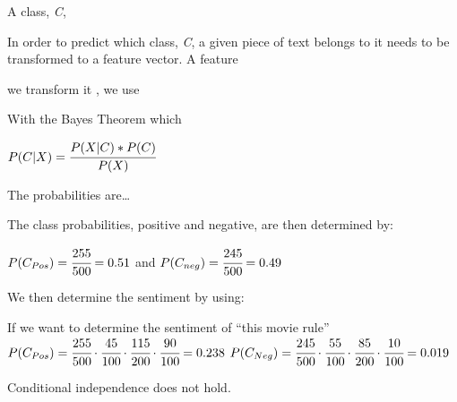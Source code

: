 


A class, \textit{C}, 



In order to predict which class, \textit{C}, a given piece of text belongs to it
needs to be transformed to a feature vector. A feature 

 we transform it , we use

With the
Bayes Theorem which

$P(C|X) = \cfrac{P(X|C)*P(C)}{P(X)}$

\citep[p.229]{MIBook}
\citep[Ch.2.1]{Bayes}
The probabilities are\ldots

The class probabilities, positive and negative, are then determined by:
\begin{center}
$P(C_{Pos}) = \cfrac{255}{500} = 0.51 $ and $P(C_{neg}) = \cfrac{245}{500} =
0.49 $
\end{center}

We then determine the sentiment by using:



If we want to determine the sentiment of ``this movie rule''  
$ P(C_{Pos}) = \cfrac{255}{500} \cdot \cfrac{45}{100} \cdot \cfrac{115}{200}
\cdot \cfrac{90}{100} = 0.238$
$ P(C_{Neg}) = \cfrac{245}{500} \cdot \cfrac{55}{100} \cdot \cfrac{85}{200}
\cdot \cfrac{10}{100} = 0.019$

 





Conditional independence does not hold.












